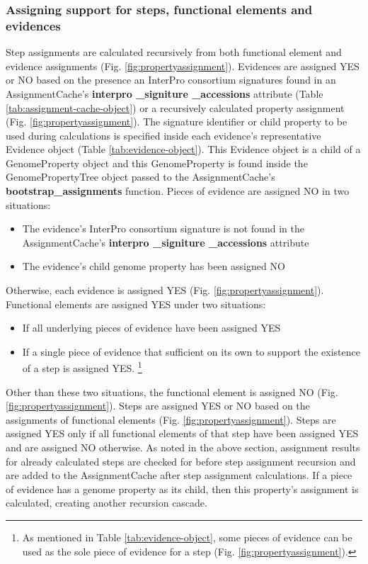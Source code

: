 \subsubsection{Assigning support for steps, functional elements and evidences}

Step assignments are calculated recursively from both functional element and evidence assignments (Fig. \ref{fig:propertyassignment}). Evidences are assigned YES or NO based on the presence an InterPro consortium signatures found in an AssignmentCache's \textbf{interpro \_signiture \_accessions} attribute (Table \ref{tab:assignment-cache-object}) or a recursively calculated property assignment (Fig. \ref{fig:propertyassignment}). The signature identifier or child property to be used during calculations is specified inside each evidence's representative Evidence object (Table \ref{tab:evidence-object}). This Evidence object is a child of a GenomeProperty object and this GenomeProperty is found inside the GenomePropertyTree object passed to the AssignmentCache's \textbf{bootstrap\_assignments} function. Pieces of evidence are assigned NO in two situations: 
\begin{itemize}
\item The evidence's InterPro consortium signature is not found in the AssignmentCache's \textbf{interpro \_signiture \_accessions} attribute 
\item The evidence's child genome property has been assigned NO 
\end{itemize}
Otherwise, each evidence is assigned YES (Fig. \ref{fig:propertyassignment}). Functional elements are assigned YES under two situations: 
\begin{itemize}
\item If all underlying pieces of evidence have been assigned YES
\item If a single piece of evidence that sufficient on its own to support the existence of a step is assigned YES. \footnote{As mentioned in Table \ref{tab:evidence-object}, some pieces of evidence can be used as the sole piece of evidence for a step (Fig. \ref{fig:propertyassignment}).}
\end{itemize}
Other than these two situations, the functional element is assigned NO (Fig. \ref{fig:propertyassignment}). Steps are assigned YES or NO based on the assignments of functional elements (Fig. \ref{fig:propertyassignment}). Steps are assigned YES only if all functional elements of that step have been assigned YES and are assigned NO otherwise. As noted in the above section, assignment results for already calculated steps are checked for before step assignment recursion and are added to the AssignmentCache after step assignment calculations. If a piece of evidence has a genome property as its child, then this property's assignment is calculated, creating another recursion cascade.

